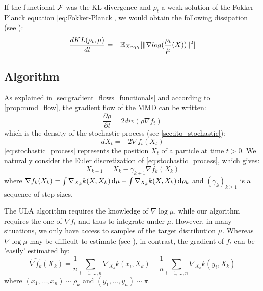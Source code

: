 \begin{remark}
	If the functional ${{\mathcal F}}$ was the KL divergence and $\rho_t$ a weak solution of the Fokker-Planck equation \eqref{eq:Fokker-Planck}, we would obtain the following dissipation (see \cite{wibisono2018sampling}):
	\begin{equation}
	\frac{d KL(\rho_t, \mu)}{dt}=-{{\mathbb E}}_{X \sim \rho_t}[\|\nabla log(\frac{\rho_t}{\mu}(X))\|^2]
	\end{equation}
\end{remark}




\subsection{Algorithm}

As explained in \cref{sec:gradient_flows_functionals} and according to \cref{prop:mmd_flow}, the gradient flow of the MMD can be written:
\begin{equation*}
\frac{\partial \rho}{\partial t}= 2 div(\rho  \nabla f_t)
\end{equation*}
which is the density of the stochastic process (see \cref{sec:ito_stochastic}):
\begin{equation}\label{eq:stochastic_process}
dX_t=-2\nabla f_t(X_t) 
\end{equation}
\eqref{eq:stochastic_process} represents the position $X_t$ of a particle at time $t > 0$.
We naturally consider the Euler discretization of \eqref{eq:stochastic_process}, which gives:
\begin{equation}\label{eq:discretization}
X_{k+1}=X_k - \gamma_{k+1} \nabla f_k(X_k)
\end{equation}
where $\nabla f_k(X_k)= \int \nabla_{X_k}k(X,X_k)\mathop{}\!\mathrm{d} \mu - \int \nabla_{X_k}k(X,X_k) \mathop{}\!\mathrm{d} \rho_k$ and $(\gamma_k)_{k\ge1}$ is a sequence of step sizes.


\begin{remark} The ULA algorithm requires the knowledge of $\nabla \log \mu$, while our algorithm requires the one of $\nabla f_t$ and thus to integrate under $\mu$. However, in many situations, we only have access to samples of the target distribution $\mu$. Whereas $\nabla \log \mu$ may be difficult to estimate (see \cite{li2017gradient}), in contrast, the gradient of $f_t$ can be 'easily' estimated by:
\begin{equation}
\widehat{\nabla f_k}(X_k)=\frac{1}{n}\sum_{i=1,\dots,n}\nabla_{X_k}k(x_i,X_k) - \frac{1}{n}\sum_{i=1,\dots,n}\nabla_{X_k}k(y_i,X_k)
\end{equation}
where $(x_1, \dots, x_n)\sim \rho_k$ and $(y_1, \dots, y_n)\sim \pi$. 
\end{remark}


